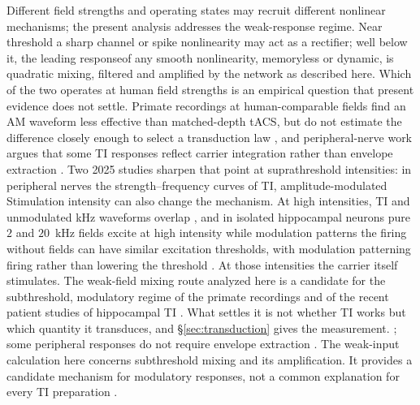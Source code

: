\documentclass[11pt,a4paper]{article}
\providecommand{\DIFaddtex}[1]{{\protect\color{blue} \sf #1}} %
\providecommand{\DIFdeltex}[1]{{\protect\color{red} \scriptsize #1}} %
\providecommand{\DIFaddbegin}{} %
\providecommand{\DIFaddend}{} %
\providecommand{\DIFdelbegin}{} %
\providecommand{\DIFdelend}{} %
\providecommand{\DIFadd}[1]{\texorpdfstring{\DIFaddtex{#1}}{#1}} %
\providecommand{\DIFdel}[1]{\texorpdfstring{\DIFdeltex{#1}}{}} %
\begin{document}
\DIFdelbegin \DIFdel{Different field strengths and operating states may recruit different nonlinear
mechanisms; the present analysis addresses the weak-response regime. Near threshold a
sharp channel or spike nonlinearity may act as a rectifier; well below it, the leading
responseof any smooth nonlinearity, memoryless or dynamic, is quadratic mixing, filtered
and amplified by the network as described here. Which of the two operates at human field
strengths is an empirical question that present evidence does not settle. Primate
recordings at human-comparable fields find an AM waveform less effective than matched-depth
tACS, but do not estimate the difference closely enough to select a transduction law
\cite{vieira2024}, and peripheral-nerve work argues that some TI responses reflect carrier
integration rather than envelope extraction \cite{peripheral2023}. Two 2025 studies sharpen
that point at suprathreshold intensities: in peripheral nerves the strength--frequency
curves of TI, amplitude-modulated }\DIFdelend \DIFaddbegin \DIFadd{Stimulation intensity can also change the mechanism. At high intensities, TI }\DIFaddend and
unmodulated kHz \DIFdelbegin \DIFdel{waveforms overlap
\cite{opancar2025}, and in isolated hippocampal neurons pure $2$ and $20$~kHz fields excite
at high intensity while modulation
patterns the firing without }\DIFdelend \DIFaddbegin \DIFadd{fields can have similar excitation thresholds, with modulation
patterning firing rather than }\DIFaddend lowering the threshold
\DIFdelbegin \DIFdel{\cite{semenov2025}. At those intensities the carrier itself stimulates. The weak-field
mixing route analyzed here is a candidate for the subthreshold, modulatory regime of the
primate recordings and of the recent patient studies of hippocampal TI \cite{vieira2024,missey2026}. What settles it is not whether TI works but which quantity
it transduces, and \S\ref{sec:transduction} gives the measurement. }\DIFdelend \DIFaddbegin \DIFadd{\cite{opancar2025,semenov2025}; some peripheral responses do not require envelope
extraction \cite{peripheral2023}. The weak-input calculation here concerns
subthreshold mixing and its amplification. It provides a candidate mechanism for
modulatory responses, not a common explanation for every TI preparation
\cite{vieira2024,missey2026}.
}\DIFaddend
\end{document}
